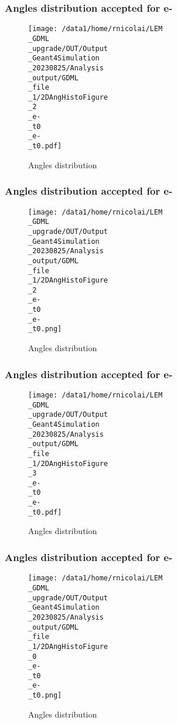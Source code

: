 \documentclass[8pt]{beamer}
\begin{document}
            \begin{frame}
                \frametitle{Angles distribution accepted for e-}
            
        \begin{figure}[h]
            \centering
            \texttt{[image: /data1/home/rnicolai/LEM\\\_GDML\\\_upgrade/OUT/Output\\\_Geant4Simulation\\\_20230825/Analysis\\\_output/GDML\\\_file\\\_1/2DAngHistoFigure\\\_2\\\_e-\\\_t0\\\_e-\\\_t0.pdf]}
            \caption{Angles distribution}
        \end{figure}
        
            \end{frame}
            
            \begin{frame}
                \frametitle{Angles distribution accepted for e-}
            
        \begin{figure}[h]
            \centering
            \texttt{[image: /data1/home/rnicolai/LEM\\\_GDML\\\_upgrade/OUT/Output\\\_Geant4Simulation\\\_20230825/Analysis\\\_output/GDML\\\_file\\\_1/2DAngHistoFigure\\\_2\\\_e-\\\_t0\\\_e-\\\_t0.png]}
            \caption{Angles distribution}
        \end{figure}
        
            \end{frame}
            
            \begin{frame}
                \frametitle{Angles distribution accepted for e-}
            
        \begin{figure}[h]
            \centering
            \texttt{[image: /data1/home/rnicolai/LEM\\\_GDML\\\_upgrade/OUT/Output\\\_Geant4Simulation\\\_20230825/Analysis\\\_output/GDML\\\_file\\\_1/2DAngHistoFigure\\\_3\\\_e-\\\_t0\\\_e-\\\_t0.pdf]}
            \caption{Angles distribution}
        \end{figure}
        
            \end{frame}
            
            \begin{frame}
                \frametitle{Angles distribution accepted for e-}
            
        \begin{figure}[h]
            \centering
            \texttt{[image: /data1/home/rnicolai/LEM\\\_GDML\\\_upgrade/OUT/Output\\\_Geant4Simulation\\\_20230825/Analysis\\\_output/GDML\\\_file\\\_1/2DAngHistoFigure\\\_0\\\_e-\\\_t0\\\_e-\\\_t0.png]}
            \caption{Angles distribution}
        \end{figure}
        
            \end{frame}
            
\end{document}
